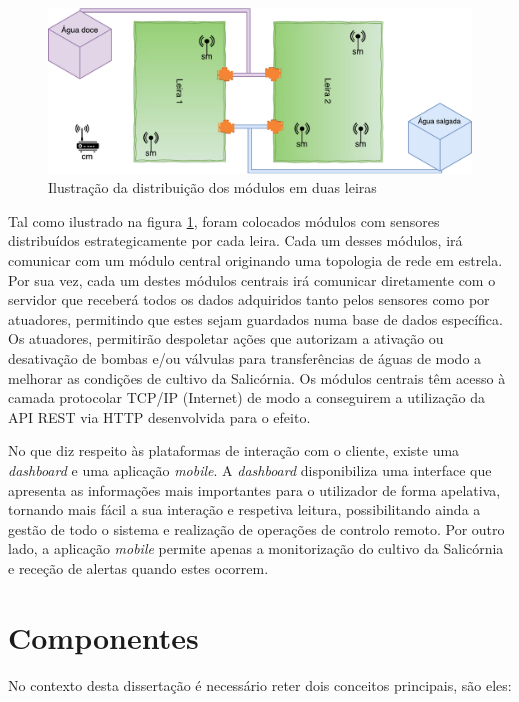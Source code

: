 \begin{figure}[!htb]
	\centering
	\includegraphics[scale=0.63]{esquemas/leiras-comm-geral.pdf}
	\caption{Ilustração da distribuição dos módulos em duas leiras}
	\label{leira}
\end{figure}


Tal como ilustrado na figura \ref{leira}, foram colocados módulos com sensores distribuídos estrategicamente por cada leira. Cada um desses módulos, irá comunicar com um módulo central originando uma topologia de rede em estrela.  Por sua vez, cada um destes módulos centrais irá comunicar diretamente com o servidor que receberá todos os dados adquiridos tanto pelos sensores como por atuadores, permitindo que estes sejam guardados numa base de dados específica. Os atuadores, permitirão despoletar ações que autorizam a ativação ou desativação de bombas e/ou válvulas para transferências de águas de modo a melhorar as condições de cultivo da Salicórnia. 
Os módulos centrais têm acesso à camada protocolar \acs{TCP}/\acs{IP} (Internet) de modo a conseguirem a utilização da \acs{API} \acs{REST} via \ac{HTTP} desenvolvida para o efeito. 

No que diz respeito às plataformas de interação com o cliente, existe uma \textit{dashboard} e uma aplicação \textit{mobile}. A \textit{dashboard} disponibiliza uma interface que apresenta as informações mais importantes para o utilizador de forma apelativa, tornando mais fácil a sua interação e respetiva leitura, possibilitando ainda a gestão de todo o sistema e realização de operações de controlo remoto. Por outro lado, a aplicação \textit{mobile} permite apenas a monitorização do cultivo da Salicórnia e receção de alertas quando estes ocorrem.




\section{Componentes}

No contexto desta dissertação é necessário reter dois conceitos principais, são eles: 

